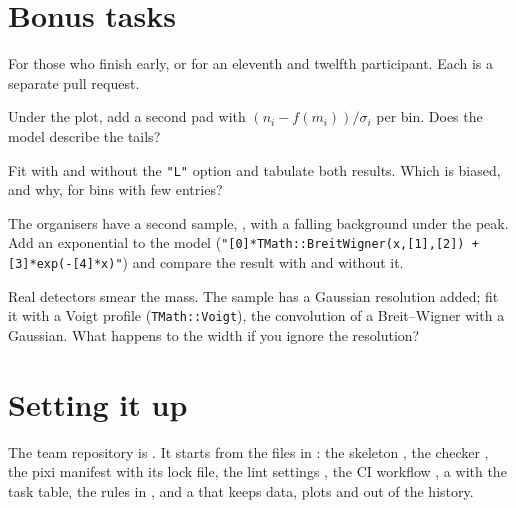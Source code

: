 \section{Bonus tasks}
\label{sec:bonus}

For those who finish early, or for an eleventh and twelfth participant. Each
is a separate pull request.

\begin{description}[style=nextline]
\item[B1: pulls] Under the plot, add a second pad with
  $(n_i - f(m_i))/\sigma_i$ per bin. Does the model describe the tails?
\item[B2: chi-square versus likelihood] Fit with and without the \texttt{"L"}
  option and tabulate both results. Which is biased, and why, for bins with
  few entries?
\item[B3: a background] The organisers have a second sample,
  , with a falling background under the peak. Add an
  exponential to the model (\texttt{"[0]*TMath::BreitWigner(x,[1],[2]) +
  [3]*exp(-[4]*x)"}) and compare the result with and without it.
\item[B4: detector resolution] Real detectors smear the mass. The sample
   has a Gaussian resolution added; fit it with a
  Voigt profile (\texttt{TMath::Voigt}), the convolution of a Breit--Wigner
  with a Gaussian. What happens to the width if you ignore the resolution?
\end{description}

\section{Setting it up}
\label{sec:teamsetup}

The team repository is . It starts from the
files in : the skeleton
, the checker , the pixi
manifest  with its lock file, the lint settings
, the CI workflow , a
 with the task table, the rules in , and
a  that keeps data, plots and  out of the
history.

\iforganiser\fi
